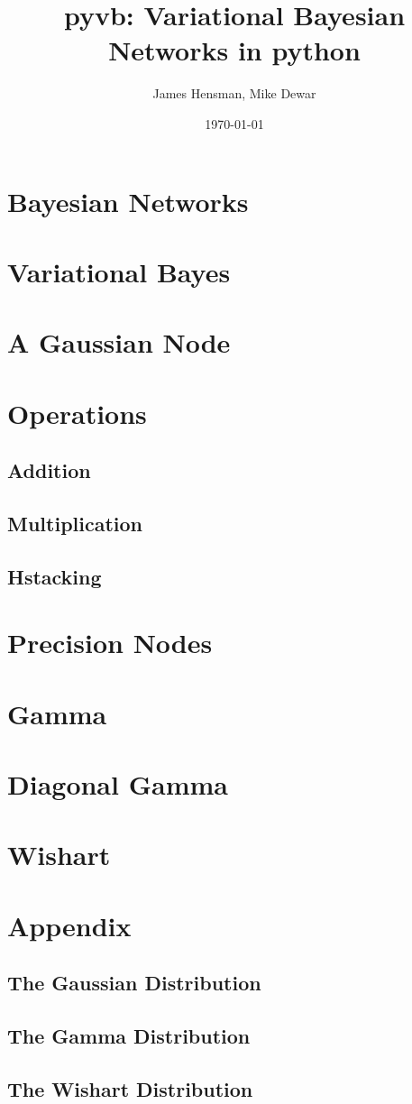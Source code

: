 \documentclass{article}
\title{pyvb: Variational Bayesian Networks in python}
\author{James Hensman, Mike Dewar}
\date{\today}
\begin{document}
\maketitle

\section{Bayesian Networks}
\section{Variational Bayes}
\section{A Gaussian Node}


\section{Operations}
\subsection{Addition}
\subsection{Multiplication}
\subsection{Hstacking}

\section{Precision Nodes}
\section{Gamma}
\section{Diagonal Gamma}
\section{Wishart}


\section{Appendix}
\subsection{The Gaussian Distribution}
\subsection{The Gamma Distribution}
\subsection{The Wishart Distribution}
\end{document}
